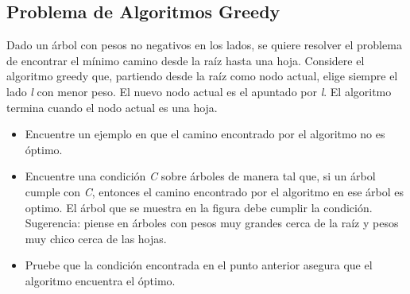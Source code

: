 \documentclass[10pt]{article}
\begin{document}
\subsection*{Problema de Algoritmos Greedy}
Dado un  \'arbol con pesos no negativos en los lados, se quiere resolver el problema de encontrar el m\'inimo camino desde la ra\'iz hasta una hoja. Considere el algoritmo greedy que, partiendo desde la ra\'iz como nodo actual, elige siempre el lado \textit{l} con menor peso. El nuevo nodo actual es
el apuntado por \textit{l}. El algoritmo termina cuando el nodo actual es una hoja.
\begin{itemize}
    \item Encuentre un ejemplo en que el camino encontrado por el algoritmo no es \'optimo.
    \item Encuentre una condici\'on \textit{C} sobre \'arboles de manera tal que, si un \'arbol cumple con \textit{C}, entonces el camino encontrado por el algoritmo en ese \'arbol es optimo. El \'arbol que se muestra en la figura debe cumplir la condici\'on. Sugerencia: piense en \'arboles con pesos muy grandes cerca de la ra\'iz y pesos muy chico cerca de las hojas.
\newline
\begin{center}
\end{center}
    \item Pruebe que la condici\'on encontrada en el punto anterior asegura que el algoritmo encuentra el \'optimo.
\end{itemize}

\end{document}
